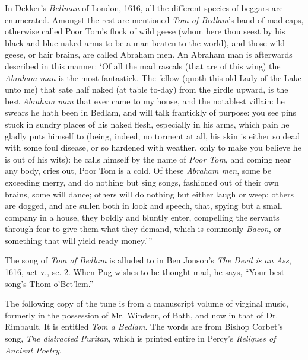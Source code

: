 In Dekker’s \textit{Bellman} of London, 1616, all the different species of beggars are
enumerated. Amongst the rest are mentioned \textit{Tom of Bedlam}’s band of mad caps,
otherwise called Poor Tom’s flock of wild geese (whom here thou seest by his black
and blue naked arms to be a man beaten to the world), and those wild geese, or hair
brains, are called Abraham men. An Abraham man is afterwards described in this
manner: ‘Of all the mad rascals (that are of this wing) the \textit{Abraham man} is the
most fantastick. The fellow (quoth this old Lady of the Lake unto me) that sate
half naked (at table to-day) from the girdle upward, is the best \textit{Abraham man} that 
ever came to my house, and the notablest villain: \pagebreak he swears he hath been in Bedlam,
and will talk frantickly of purpose: you see pins stuck in sundry places of his naked
flesh, especially in his arms, which pain he gladly puts himself to (being, indeed, no
torment at all, his skin is either so dead with some foul disease, or so hardened with
weather, only to make you believe he is out of his wits): he calls himself by the name
of \textit{Poor Tom}, and coming near any body, cries out, Poor Tom is a cold. Of these
\textit{Abraham men}, some be exceeding merry, and do nothing but sing songs, fashioned
out of their own brains, some will dance; others will do nothing but either laugh or
weep; others are dogged, and are sullen both in look and speech, that, spying but a
small company in a house, they boldly and bluntly enter, compelling the servants
through fear to give them what they demand, which is commonly \textit{Bacon}, or something
that will yield ready money.’”

The song of \textit{Tom of Bedlam} is alluded to in Ben Jonson’s \textit{The Devil is an Ass},
1616, act v., sc. 2. When Pug wishes to be thought mad, he says, “Your best
song’s Thom o’Bet’lem.”

The following copy of the tune is from a manuscript volume of virginal music,
formerly in the possession of Mr. Windsor, of Bath, and now in that of
Dr. Rimbault. It is entitled \textit{Tom a Bedlam}. The words are from Bishop
Corbet’s song, \textit{The distracted Puritan}, which is printed entire in Percy’s \textit{Reliques
of Ancient Poetry}.




\pagebreak


